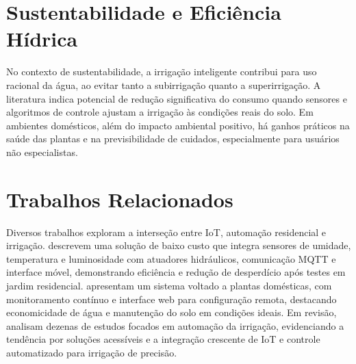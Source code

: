 \documentclass[twoside,english,brazilian]{UNISINOSmonografia}
\begin{document}
\section{Sustentabilidade e Eficiência Hídrica}
No contexto de sustentabilidade, a irrigação inteligente contribui para uso racional da água, ao evitar tanto a subirrigação quanto a superirrigação. A literatura indica potencial de redução significativa do consumo quando sensores e algoritmos de controle ajustam a irrigação às condições reais do solo. Em ambientes domésticos, além do impacto ambiental positivo, há ganhos práticos na saúde das plantas e na previsibilidade de cuidados, especialmente para usuários não especialistas.

\section{Trabalhos Relacionados}
Diversos trabalhos exploram a interseção entre IoT, automação residencial e irrigação.  descrevem uma solução de baixo custo que integra sensores de umidade, temperatura e luminosidade com atuadores hidráulicos, comunicação MQTT e interface móvel, demonstrando eficiência e redução de desperdício após testes em jardim residencial.  apresentam um sistema voltado a plantas domésticas, com monitoramento contínuo e interface web para configuração remota, destacando economicidade de água e manutenção do solo em condições ideais. Em revisão,  analisam dezenas de estudos focados em automação da irrigação, evidenciando a tendência por soluções acessíveis e a integração crescente de IoT e controle automatizado para irrigação de precisão.
\end{document}
